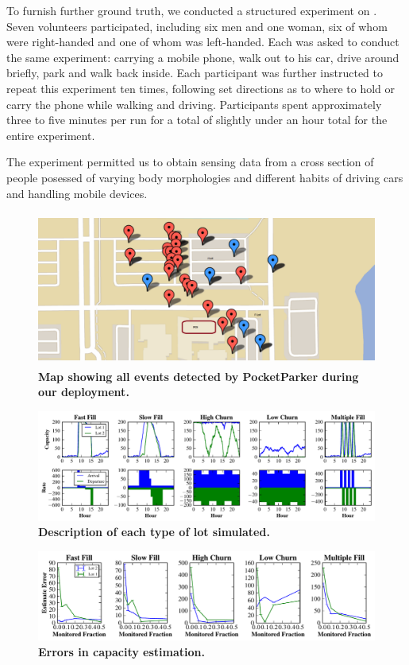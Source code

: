To furnish further ground truth, we conducted a structured experiment on
.  Seven volunteers participated, including six men
and one woman, six of whom were right-handed and one of whom was left-handed.
Each was asked to conduct the same experiment:  carrying a mobile phone, walk
out to his car, drive around briefly, park and walk back inside.  Each
participant was further instructed to repeat this experiment ten times,
following set directions as to where to hold or carry the phone while walking
and driving.  Participants spent approximately three to five minutes per run
for a total of slightly under an hour total for the entire experiment.

The experiment permitted us to obtain sensing data from a cross section of
people posessed of varying body morphologies and different habits of driving
cars and handling mobile devices.

\begin{figure}
\centering
\includegraphics[width=\textwidth,height=2in]{./figures/detectedEventsOnMap.pdf}

\caption{\textbf{Map showing all events detected by PocketParker during our
deployment.} }

\label{fig-energy}
\end{figure}

\begin{figure}
\centering
\includegraphics[width=\textwidth]{./simulator/figures/lots.pdf}

\caption{\textbf{Description of each type of lot simulated.} }

\label{fig-lotsdescription}
\end{figure}

\begin{figure}
\centering
\includegraphics[width=\textwidth]{./simulator/figures/capacity_experiment.pdf}

\caption{\textbf{Errors in capacity estimation.} }

\label{fig-lotsdescription}
\end{figure}

